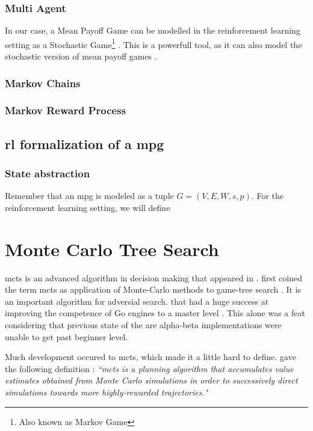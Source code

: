 \subsubsection{Multi Agent}
In our case, a Mean Payoff Game can be modelled in the reinforcement learning setting as a Stochastic Game\footnote{Also known as Markov Game} \cite{StochasticGames}.
\newline This is a powerfull tool, as it can also model the stochastic version of mean payoff games \cite{StochasticMPG}. 

\subsubsection{Markov Chains}
\subsubsection{Markov Reward Process}
\subsection{\acrshort{rl} formalization of a \acrshort{mpg}}
\subsubsection{State abstraction}
Remember that an \acrshort{mpg} is modeled as a tuple $G=(V,E,W,s,p).$
\newline For the reinforcement learning setting, we will define 


\section{Monte Carlo Tree Search}
\acrfull{mcts} is an advanced algorithm in decision making that appeared in . \citeauthor{MCTSOriginal} first coined the term \acrshort{mcts} as application of Monte-Carlo methods to game-tree search \cite{MCTSOriginal}. It is an important algorithm for adversial search. that had a huge success at improving the competence of Go engines to a master level \cite{GoMaster}. This alone was a feat considering that previous state of the are alpha-beta implementations were unable to get past beginner level. 

Much development occured to \acrshort{mcts}, which made it a little hard to define. \citeauthor{RLIntroduction} gave the following definition \cite[section.~8.8]{RLIntroduction}: \textit{``\acrfull{mcts} is a planning algorithm that accumulates value estimates obtained from Monte Carlo simulations in order to successively direct simulations towards more highly-rewarded trajectories."}

